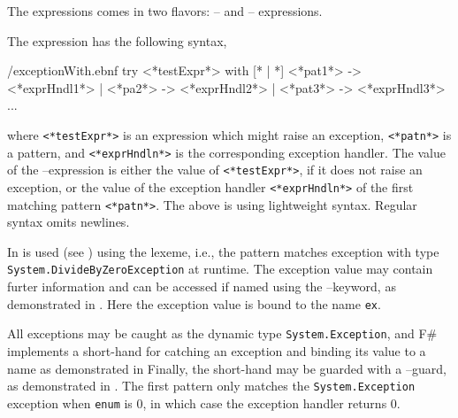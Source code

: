 \documentclass[fsharpNotes.tex]{subfiles}
\begin{document}
The  expressions comes in two flavors: -- and -- expressions.

The  expression has the following syntax,
%
\begin{verbatimwrite}{\ebnf/exceptionWith.ebnf}
try
   <*testExpr*>
with
   [* | *] <*pat1*> -> <*exprHndl1*>
   | <*pa2*> -> <*exprHndl2*>
   | <*pat3*> -> <*exprHndl3*>
   ...
\end{verbatimwrite}
%
where \lstinline[language=syntax]{<*testExpr*>} is an expression which might raise an exception, \lstinline[language=syntax]{<*patn*>} is a pattern, and \lstinline[language=syntax]{<*exprHndln*>} is the corresponding exception handler. The value of the --expression is either the value of \lstinline[language=syntax]{<*testExpr*>}, if it does not raise an exception, or the value of the exception handler \lstinline[language=syntax]{<*exprHndln*>} of the first matching pattern \lstinline[language=syntax]{<*patn*>}. The above is using lightweight syntax. Regular syntax omits newlines.

In   is used (see ) using the  lexeme, i.e., the pattern matches exception with type \lstinline{System.DivideByZeroException} at runtime. The exception value may contain furter information and can be accessed if named using the --keyword, as demonstrated in .
%
%
Here the exception value is bound to the name \lstinline{ex}.

All exceptions may be caught as the dynamic type \lstinline{System.Exception}, and F\# implements a short-hand for catching an exception and binding its value to a name as demonstrated in 
%
%
Finally, the short-hand may be guarded with a --guard, as demonstrated in .
%
%
The first pattern only matches the \lstinline{System.Exception} exception when \lstinline{enum} is 0, in which case the exception handler returns 0.
\end{document}
